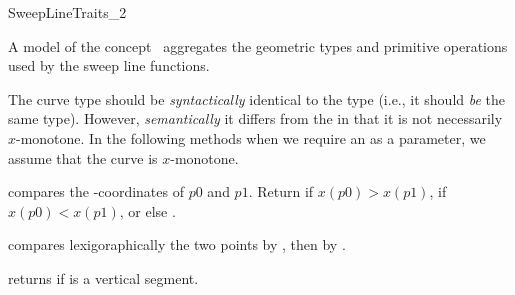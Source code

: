 

\begin{ccRefConcept}{SweepLineTraits_2}


\ccDefinition
  
A model of the concept \ccRefName\ aggregates the geometric types and
primitive operations used by the sweep line functions.


\ccTypes


  The curve type  should be {\it syntactically} identical
  to the  type (i.e., it should {\em be} the same
  type).  However, {\it semantically} it differs from the
   in that it is not necessarily $x$-monotone. In the
  following methods when we require an  as a parameter,
  we assume that the curve is $x$-monotone.


\ccOperations

     {compares the -coordinates
       of $p0$ and $p1$.  Return  if $x(p0) >
       x(p1)$,  if $x(p0) < x(p1)$, or else
       .  }
    
     {compares lexigoraphically the two points 
       by , then by . }


   {returns  if  is a vertical segment.}
        

\end{ccRefConcept}

